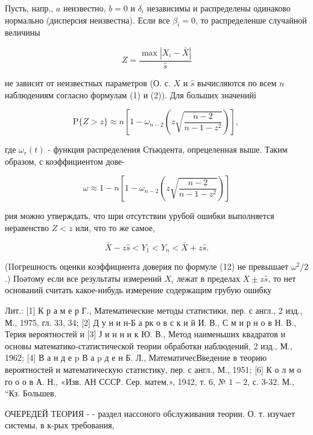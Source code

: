 \documentclass[10pt]{article}
\begin{document}
Пусть, напр., $a$ неизвестно, $b=0$ и $\delta_{i}$ независимы и распределены одинаково нормально (дисперсия неизвестна). Если все $\beta_{i}=0$, то распределенше случайной величины

\[
Z=\frac{\max \left|X_{i}-\bar{X}\right|}{\hat{s}}
\]

не зависит от неизвестных параметров (О. с. $X$ и $\hat{s}$ вычисляются по всем $n$ наблюдениям согласно формулам (1) и (2)). Для больших значенийі

\[
\mathrm{P}\{Z>z\} \approx n\left[1-\omega_{n-2}\left(z \sqrt{\frac{n-2}{n-1-z^{2}}}\right)\right] \text {, }
\]

где $\omega_{r}(t)$ - функция распределения Стьюдента, опрецеленная выше. Таким образом, с коэффициентом дове-

\[
\omega \approx 1-n\left[1-\omega_{n-2}\left(z \sqrt{\frac{n-2}{n-1-z^{2}}}\right)\right]
\]

рия можно утверждать, что шри отсутствии урубой ошибки выполняется неравенство $Z<z$ или, что то же самое,

\[
\bar{X}-z \hat{s}<Y_{1}<Y_{n}<\bar{X}+z \hat{s} .
\]

(IIогрешность оценки коэффициента доверия по формуле (12) не превышает $\omega^{2} / 2$.) Поәтому если все результаты измерений $X_{i}$ лежат в пределах $X \pm z \hat{s}$, то нет оснований считать какое-нибудь измерение содержащим грубую ошибку

Лит.: [1] К р а м е р Г., Математические методы статистики, пер. с англ., 2 изд., М., 1975, гл. 33, 34; [2] Д у н и н-Б а рк о в с к и й И. В., С м и р н о в Н. В., Терия вероятностей и [3] Ј и н н и к Ю. В., Метод наименьших квадратов и основы математико-статистической теории обработки наблюдений, 2 изд., М., 1962; [4] В а н д е $\mathrm{p}$ В а p д е н Б. Л., МатематичесВведение в теорию вероятностей и математическую статистику, пер. с англ., М., 1951; [6] К о л м о го о о в А. Н., «Изв. АН СССР. Сер. матем.», 1942, т. 6, № $1-2$, с. 3-32. М., “Кз. Большев.

ОЧЕРЕДЕЙ ТЕОРИЯ - - раздел иассоного обслуживания теории. О. т. изучает системы, в к-рых требования,
\end{document}
